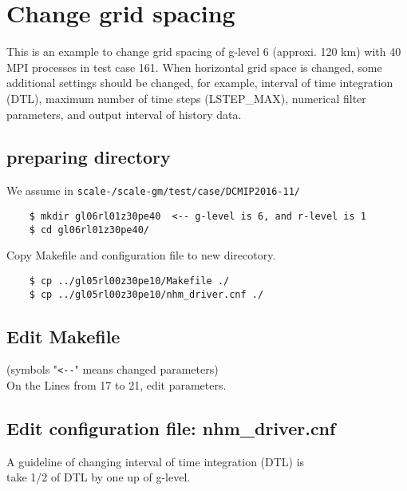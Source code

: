 \section{Change grid spacing}
 \noindent This is an example to change grid spacing of g-level 6
 (approxi. 120 km) with 40 MPI processes in test case 161.
 When horizontal grid space is changed, some additional settings
 should be changed, for example, interval of time integration (DTL),
 maximum number of time steps (LSTEP\_MAX), numerical filter parameters,
 and output interval of history data.

\subsection{preparing directory}
 We assume in \texttt{scale-{\version}/scale-gm/test/case/DCMIP2016-11/}
 \begin{verbatim}
    $ mkdir gl06rl01z30pe40  <-- g-level is 6, and r-level is 1
    $ cd gl06rl01z30pe40/
 \end{verbatim}

 \noindent Copy Makefile and configuration file to new direcotory.
 \begin{verbatim}
    $ cp ../gl05rl00z30pe10/Makefile ./
    $ cp ../gl05rl00z30pe10/nhm_driver.cnf ./
 \end{verbatim}

\subsection{Edit Makefile}
 (symbols "\verb|<--|" means changed parameters) \\
 On the Lines from 17 to 21, edit parameters.

\subsection{Edit configuration file: nhm\_driver.cnf}
 \noindent A guideline of changing interval of time integration (DTL) is \\
 {\sf take 1/2 of DTL by one up of g-level}.

